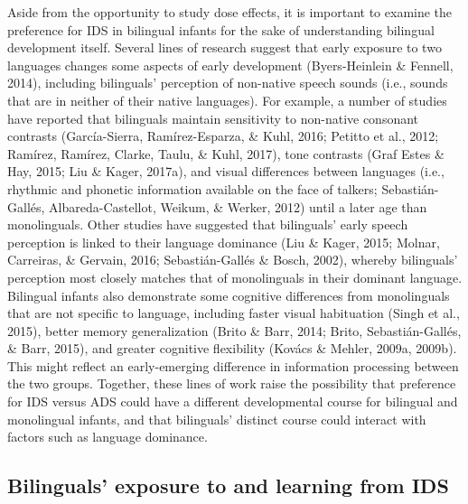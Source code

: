 \documentclass[english,,man,floatsintext]{apa6}
\begin{document}
Aside from the opportunity to study dose effects, it is important to examine the preference for IDS in bilingual infants for the sake of understanding bilingual development itself. Several lines of research suggest that early exposure to two languages changes some aspects of early development (Byers-Heinlein \& Fennell, 2014), including bilinguals' perception of non-native speech sounds (i.e., sounds that are in neither of their native languages). For example, a number of studies have reported that bilinguals maintain sensitivity to non-native consonant contrasts (García-Sierra, Ramírez-Esparza, \& Kuhl, 2016; Petitto et al., 2012; Ramírez, Ramírez, Clarke, Taulu, \& Kuhl, 2017), tone contrasts (Graf Estes \& Hay, 2015; Liu \& Kager, 2017a), and visual differences between languages (i.e., rhythmic and phonetic information available on the face of talkers; Sebastián-Gallés, Albareda-Castellot, Weikum, \& Werker, 2012) until a later age than monolinguals. Other studies have suggested that bilinguals' early speech perception is linked to their language dominance (Liu \& Kager, 2015; Molnar, Carreiras, \& Gervain, 2016; Sebastián-Gallés \& Bosch, 2002), whereby bilinguals' perception most closely matches that of monolinguals in their dominant language. Bilingual infants also demonstrate some cognitive differences from monolinguals that are not specific to language, including faster visual habituation (Singh et al., 2015), better memory generalization (Brito \& Barr, 2014; Brito, Sebastián-Gallés, \& Barr, 2015), and greater cognitive flexibility (Kovács \& Mehler, 2009a, 2009b). This might reflect an early-emerging difference in information processing between the two groups. Together, these lines of work raise the possibility that preference for IDS versus ADS could have a different developmental course for bilingual and monolingual infants, and that bilinguals' distinct course could interact with factors such as language dominance.

\hypertarget{bilinguals-exposure-to-and-learning-from-ids}{%
\subsection{Bilinguals' exposure to and learning from IDS}\label{bilinguals-exposure-to-and-learning-from-ids}}
\end{document}
